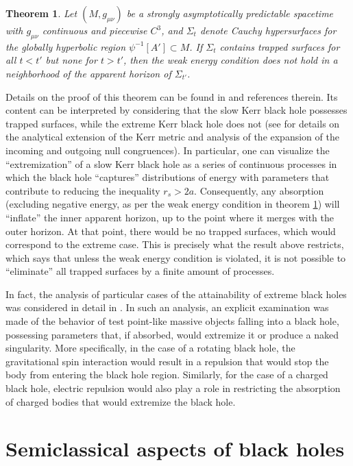 \documentclass[
12pt,		%
openright,	%
twoside,  %
a4paper,			%
chapter=TITLE,		%
english,			%
french,				%
spanish,			%
brazil				%
]{USPSC-classe/USPSC}
\newtheorem{theorem}{Theorem}[section]
\begin{document}
\begin{theorem}\label{thekappa}
    Let $(M,g_{\mu\nu})$ be a strongly asymptotically predictable spacetime with $g_{\mu\nu}$ continuous and piecewise $C^3$, and $\Sigma_t$ denote Cauchy hypersurfaces for the globally hyperbolic region $\psi^{-1}[A']\subset M$. If $\Sigma_t$ contains trapped surfaces for all $t<t'$ but none for $t>t'$, then the weak energy condition does not hold in a neighborhood of the apparent horizon of $\Sigma_{t'}$.
\end{theorem}

Details on the proof of this theorem can be found in \cite{Israel1986} and references therein. Its content can be interpreted by considering that the slow Kerr black hole possesses trapped surfaces, while the extreme Kerr black hole does not (see \cite{ONeill1995} for details on the analytical extension of the Kerr metric and analysis of the expansion of the incoming and outgoing null congruences). In particular, one can visualize the “extremization” of a slow Kerr black hole as a series of continuous processes in which the black hole “captures” distributions of energy with parameters that contribute to reducing the inequality $r_s>2a$. Consequently, any absorption (excluding negative energy, as per the weak energy condition in theorem \ref{thekappa}) will “inflate” the inner apparent horizon, up to the point where it merges with the outer horizon. At that point, there would be no trapped surfaces, which would correspond to the extreme case. This is precisely what the result above restricts, which says that unless the weak energy condition is violated, it is not possible to “eliminate” all trapped surfaces by a finite amount of processes. 

In fact, the analysis of particular cases of the attainability of extreme black holes was considered in detail in \cite{Wald1974,Sorce2017}. In such an analysis, an explicit examination was made of the behavior of test point-like massive objects falling into a black hole, possessing parameters that, if absorbed, would extremize it or produce a naked singularity. More specifically, in the case of a rotating black hole, the gravitational spin interaction \cite{Wald1972} would result in a repulsion that would stop the body from entering the black hole region. Similarly, for the case of a charged black hole, electric repulsion would also play a role in restricting the absorption of charged bodies that would extremize the black hole.


\chapter{Semiclassical aspects of black holes}\label{chapter3}
\end{document}
